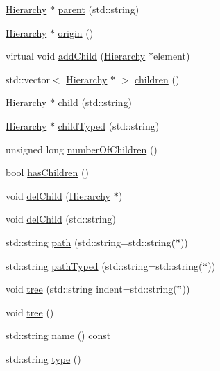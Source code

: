 \begin{DoxyCompactItemize}
\item 
\hyperlink{classHierarchy}{Hierarchy} $\ast$ \hyperlink{classHierarchy_ad550588733bf75ac5c0fcfd7c8fd11a6}{parent} (std\+::string)
\item 
\hyperlink{classHierarchy}{Hierarchy} $\ast$ \hyperlink{classHierarchy_aee461dc930ce3871636ff87f075b1b83}{origin} ()
\item 
virtual void \hyperlink{classHierarchy_ad677774ff38fcb257c04a3a10d471fac}{add\+Child} (\hyperlink{classHierarchy}{Hierarchy} $\ast$element)
\item 
std\+::vector$<$ \hyperlink{classHierarchy}{Hierarchy} $\ast$ $>$ \hyperlink{classHierarchy_aa9a76f69e98e052ee1a6e32cea006288}{children} ()
\item 
\hyperlink{classHierarchy}{Hierarchy} $\ast$ \hyperlink{classHierarchy_a1e207f973c694b538bf90107b4868817}{child} (std\+::string)
\item 
\hyperlink{classHierarchy}{Hierarchy} $\ast$ \hyperlink{classHierarchy_a0c15a5276a3b80b4354d6bd8a01e0708}{child\+Typed} (std\+::string)
\item 
unsigned long \hyperlink{classHierarchy_ab16e84de65fd84e14001a6cf941c8be4}{number\+Of\+Children} ()
\item 
bool \hyperlink{classHierarchy_a255174fe4d316d2a3f430dcb9dab29f1}{has\+Children} ()
\item 
void \hyperlink{classHierarchy_a2b2b359fac003233f65786a616766bde}{del\+Child} (\hyperlink{classHierarchy}{Hierarchy} $\ast$)
\item 
void \hyperlink{classHierarchy_a1928ac7615fe0b5e55cd707f70dc6781}{del\+Child} (std\+::string)
\item 
std\+::string \hyperlink{classHierarchy_aa7990fa7caf132d83e361ce033c6c65a}{path} (std\+::string=std\+::string(\char`\"{}\char`\"{}))
\item 
std\+::string \hyperlink{classHierarchy_a1efd56cd164d328d2002e53a10a19b8c}{path\+Typed} (std\+::string=std\+::string(\char`\"{}\char`\"{}))
\item 
void \hyperlink{classHierarchy_a76e914b9a677a22a82deb74d892bf261}{tree} (std\+::string indent=std\+::string(\char`\"{}\char`\"{}))
\item 
void \hyperlink{classHierarchy_a594c294c5f60c230e106d522ed008212}{tree} ()
\item 
std\+::string \hyperlink{classObject_a300f4c05dd468c7bb8b3c968868443c1}{name} () const
\item 
std\+::string \hyperlink{classObject_a84f99f70f144a83e1582d1d0f84e4e62}{type} ()
\item 

\end{DoxyCompactItemize}
